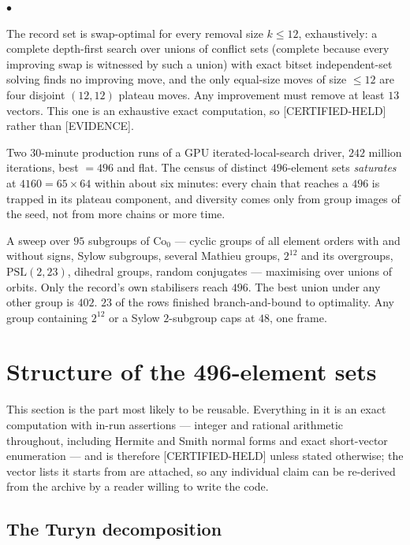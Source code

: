 \documentclass[10pt,a4paper]{article}
\newenvironment{tightlist}%
  {\begin{list}{$\bullet$}{%
     \setlength{\leftmargin}{1.6em}\setlength{\labelwidth}{1em}%
     \setlength{\labelsep}{0.6em}\setlength{\itemsep}{2pt}%
     \setlength{\topsep}{3pt}\setlength{\parsep}{0pt}}}%
  {\end{list}}
\newcommand{\CH}{\textsf{[CERTIFIED-HELD]}}
\newcommand{\EV}{\textsf{[EVIDENCE]}}
\newcommand{\Co}{\mathrm{Co}_0}
\begin{document}
\begin{tightlist}
\item The record set is swap-optimal for every removal size $k \le 12$, exhaustively: a complete
  depth-first search over unions of conflict sets (complete because every improving swap is
  witnessed by such a union) with exact bitset independent-set solving finds no improving move, and
  the only equal-size moves of size $\le 12$ are four disjoint $(12,12)$ plateau moves. Any
  improvement must remove at least $13$ vectors. This one is an exhaustive exact computation, so
  \CH{} rather than \EV{}.
\item Two $30$-minute production runs of a GPU iterated-local-search driver, $242$ million
  iterations, best $= 496$ and flat. The census of distinct $496$-element sets \emph{saturates} at
  $4160 = 65 \times 64$ within about six minutes: every chain that reaches a $496$ is trapped in its
  plateau component, and diversity comes only from group images of the seed, not from more chains or
  more time.
\item A sweep over $95$ subgroups of $\Co$ --- cyclic groups of all element orders with and without
  signs, Sylow subgroups, several Mathieu groups, $2^{12}$ and its overgroups,
  $\mathrm{PSL}(2,23)$, dihedral groups, random conjugates --- maximising over unions of orbits.
  Only the record's own stabilisers reach $496$. The best union under any other group is $402$.
  $23$ of the rows finished branch-and-bound to optimality. Any group containing $2^{12}$ or a
  Sylow $2$-subgroup caps at $48$, one frame.
\end{tightlist}

\section{Structure of the 496-element sets}

This section is the part most likely to be reusable. Everything in it is an exact computation with
in-run assertions --- integer and rational arithmetic throughout, including Hermite and Smith normal
forms and exact short-vector enumeration --- and is therefore \CH{} unless stated otherwise; the
vector lists it starts from are attached, so any individual claim can be re-derived from the archive
by a reader willing to write the code.

\subsection{The Turyn decomposition}
\end{document}
